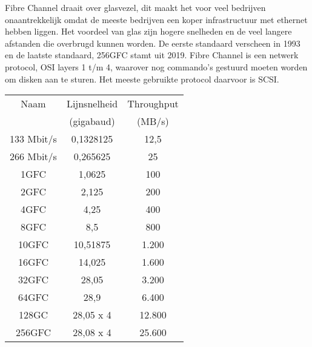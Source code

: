 Fibre Channel draait over glasvezel, dit maakt het voor veel bedrijven onaantrekkelijk omdat de meeste bedrijven een koper infrastructuur met ethernet hebben liggen. Het voordeel van glas zijn hogere snelheden en de veel langere afstanden die overbrugd kunnen worden. De eerste standaard verscheen in 1993 en de laatste standaard, 256GFC stamt uit 2019. Fibre Channel is een netwerk protocol, OSI layers 1 t/m 4, waarover nog commando's gestuurd moeten worden om disken aan te sturen. Het meeste gebruikte protocol daarvoor is SCSI.

\begin{center}
\begin{tabular}{ |c|c|c| }
\hline
Naam       & Lijnsnelheid & Throughput \\
           & (gigabaud)   & (MB/s) \\
\hline\hline
133 Mbit/s & 0,1328125    & 12,5 \\
\hline
266 Mbit/s & 0,265625     & 25 \\
\hline
1GFC       & 1,0625       & 100 \\
\hline
2GFC       & 2,125        & 200 \\
\hline
4GFC       & 4,25         & 400 \\
\hline
8GFC       & 8,5          & 800 \\
\hline
10GFC      & 10,51875     & 1.200 \\
\hline
16GFC      & 14,025       & 1.600 \\
\hline
32GFC      & 28,05        & 3.200 \\
\hline
64GFC      & 28,9         & 6.400 \\
\hline
128GC      & 28,05 x 4    & 12.800 \\
\hline
256GFC     & 28,08 x 4    & 25.600 \\
\hline
\end{tabular}
\end{center}
